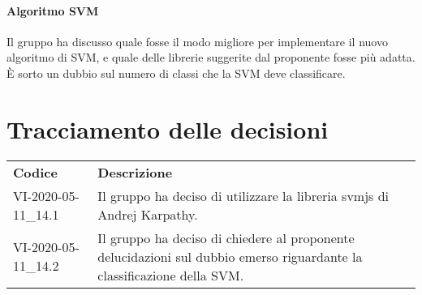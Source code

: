 \documentclass{article}
\begin{document}
\paragraph*{Algoritmo SVM}
Il gruppo ha discusso quale fosse il modo migliore per implementare il nuovo algoritmo di SVM, e quale delle librerie suggerite dal proponente fosse più adatta.
È sorto un dubbio sul numero di classi che la SVM deve classificare.

\section{Tracciamento delle decisioni}
\begin{table}[H]
  \centering
  \begin{tabular}{p{4cm}|p{12cm}}
    \rowcolor{lightgray}
    \textbf{Codice}  & \textbf{Descrizione}      \\
    VI-2020-05-11\_14.1 & Il gruppo ha deciso di utilizzare la libreria svmjs di Andrej Karpathy.\\
    VI-2020-05-11\_14.2 & Il gruppo ha deciso di chiedere al proponente delucidazioni sul dubbio emerso riguardante la classificazione della SVM.\\
  \end{tabular}
\end{table}
\end{document}
